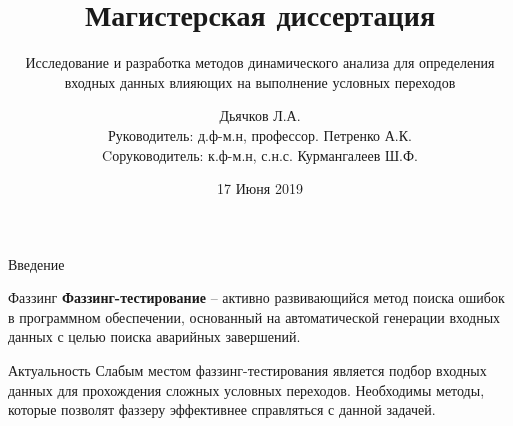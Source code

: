 \documentclass[10pt]{beamer}
\title{Магистерская диссертация}
\subtitle{Исследование и разработка методов динамического анализа для определения входных данных влияющих на выполнение условных переходов}
\author{Дьячков Л.А.\\[3mm]{\small Руководитель: д.ф-м.н, профессор. Петренко А.К.}\\[1mm]
{\small Cоруководитель: к.ф-м.н, с.н.с. Курмангалеев Ш.Ф.}\\[3mm]
}
\institute{ИСП РАН}
\date{17 Июня 2019}
\begin{document}
\maketitle



\begin{frame}{Введение}
  \begin{block}{Фаззинг}
  \textbf{Фаззинг-тестирование} -- активно развивающийся метод поиска ошибок в программном обеспечении, основанный на автоматической генерации входных данных с целью поиска аварийных завершений.
  \end{block}

  \begin{block}{Актуальность}
  Слабым местом фаззинг-тестирования является подбор входных данных для прохождения сложных условных переходов. Необходимы методы, которые позволят фаззеру эффективнее справляться с данной задачей.

  \end{block}
\end{frame}
\end{document}
